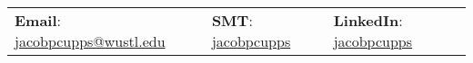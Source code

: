 \documentclass[letterpaper, 11pt]{article}
\begin{document}

\vspace{0.5cm} 
\begin{center}
\begin{tabular}{lll}
\textbf{Email}: \href{mailto:jacobpcupps@wustl.edu}{jacobpcupps@wustl.edu}      &
\hspace{0.55in} \textbf{SMT}: \href{https://members.societymusictheory.org/member/jacobpcupps}{jacobpcupps}    &
\hspace{0.4in} 	\textbf{LinkedIn}: \href{https://www.linkedin.com/in/jacobpcupps/}{jacobpcupps}  \\
\end{tabular}
\end{center}


\setlength{\tabcolsep}{8pt}
\end{document}
